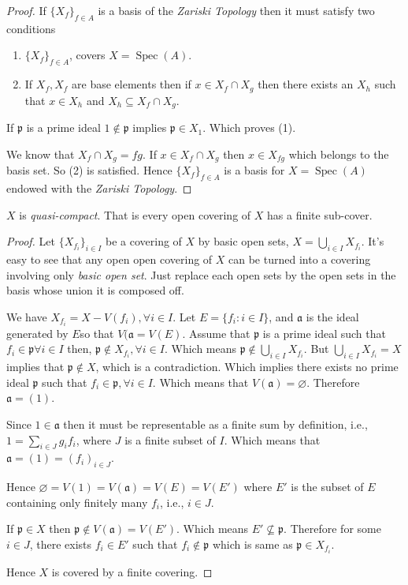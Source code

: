 \documentclass[]{report}
\DeclareMathOperator\Spec{Spec}
\begin{document}
\begin{proof}
    If $\{X_f\}_{f \in A}$ is a basis of the \textit{Zariski Topology} then it must satisfy two conditions
    \begin{enumerate}
        \item $\{X_f\}_{f \in A}$, covers $X = \Spec(A)$.
        \item If $X_f, X_f$ are base elements then if $x \in X_f \cap X_g$ then there exists an $X_h$ such that $x \in X_h$ and $X_h \subseteq X_f \cap X_g$.     \end{enumerate}

    If $\mathfrak{p}$ is a prime ideal $1 \not \in \mathfrak{p}$  implies $\mathfrak{p} \in X_1$. Which proves (1).

    We know that $X_f \cap X_g = fg$. If $x \in X_f \cap X_g$ then $x \in X_{fg}$ which belongs to the basis set. So (2) is satisfied. Hence $\{X_f\}_{f \in A}$ is a basis for $X = \Spec(A)$ endowed with the \textit{Zariski Topology}.

\end{proof}

$X$ is \textit{quasi-compact}. That is every open covering of $X$ has a finite sub-cover.
\begin{proof}
    Let $\{X_{f_i}\}_{i \in I}$ be a covering of $X$ by basic open sets, $X = \bigcup_{i \in I} X_{f_i}$. It's easy to see that any open open covering of $X$ can be turned into a covering involving only \textit{basic open set}. Just replace each open sets by the open sets in the basis whose union it is composed off. 

    We have $X_{f_i} = X - V(f_i), \forall i \in I$. Let $E = \{f_i : i \in I\}$, and $\mathfrak{a}$ is the ideal generated by $E$so that $V(\mathfrak{a} = V(E)$. Assume that $\mathfrak{p}$ is a prime ideal such that $f_i \in \mathfrak{p} \forall i \in I$ then, $\mathfrak{p} \not \in X_{f_i}, \forall i \in I$. Which means $\mathfrak{p} \not \in \bigcup_{i \in I} X_{f_i}$. But $\bigcup_{i \in I} X_{f_i} = X$ implies that $\mathfrak{p} \not \in X$, which is a contradiction. Which implies there exists no prime ideal $\mathfrak{p}$ such that $f_i \in \mathfrak{p}, \forall i \in I$. Which means that $V(\mathfrak{a}) = \varnothing$. Therefore $\mathfrak{a} = (1)$.

    Since $1 \in \mathfrak{a}$ then it must be representable as a finite sum  by definition, i.e., $1 = \sum_{i \in J} g_i f_i$, where $J$ is a finite subset of $I$. Which means that $\mathfrak{a} = (1) = (f_i)_{i \in J}$.
    
    Hence $\varnothing = V(1) = V(\mathfrak{a}) = V(E) = V(E')$ where $E'$ is the subset of $E$ containing only finitely many $f_i$, i.e., $i \in J$. 

    If $\mathfrak{p} \in X$ then $\mathfrak{p} \not \in V(\mathfrak{a}) = V(E')$. Which means $E' \not \subseteq \mathfrak{p}$. Therefore for some $i \in J$, there exists $f_i \in E'$ such that $f_i \not \in \mathfrak{p}$ which is same as $\mathfrak{p} \in X_{f_i}$.

    Hence $X$ is covered by a finite covering.
\end{proof}
\end{document}
